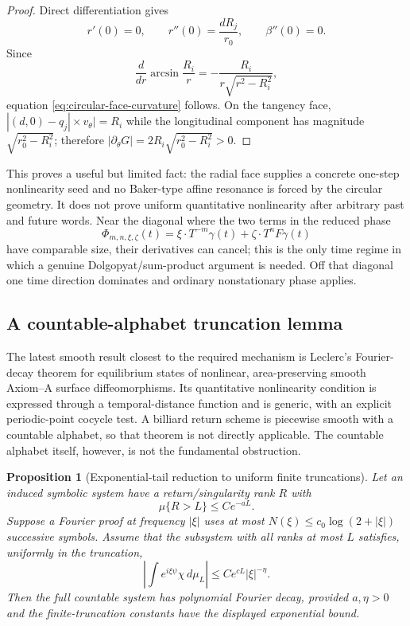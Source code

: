 \documentclass[11pt]{article}
\newtheorem{proposition}[theorem]{Proposition}
\begin{document}
\begin{proof}
Direct differentiation gives
\[
 r'(0)=0,\qquad r''(0)=\frac{dR_j}{r_0},\qquad
 \beta''(0)=0.
\]
Since
\[
 \frac d{dr}\arcsin\frac{R_i}{r}
 =-\frac{R_i}{r\sqrt{r^2-R_i^2}},
\]
equation \eqref{eq:circular-face-curvature} follows.  On the tangency face,
$|(d,0)-q_j|\times v_\theta|=R_i$ while the longitudinal component has
magnitude $\sqrt{r_0^2-R_i^2}$; therefore
$|\partial_\theta G|=2R_i\sqrt{r_0^2-R_i^2}>0$.
\end{proof}

This proves a useful but limited fact: the radial face supplies a concrete
one-step nonlinearity seed and no Baker-type affine resonance is forced by
the circular geometry.  It does not prove uniform quantitative nonlinearity
after arbitrary past and future words.  Near the diagonal where the two
terms in the reduced phase
\begin{equation}
\label{eq:phase}
 \Phi_{m,n,\xi,\zeta}(t)
 =\xi\cdot T^{-m}\gamma(t)+\zeta\cdot T^nF\gamma(t)
\end{equation}
have comparable size, their derivatives can cancel;
this is the only time regime in which a genuine Dolgopyat/sum-product
argument is needed.  Off that diagonal one time direction dominates and
ordinary nonstationary phase applies.

\subsection{A countable-alphabet truncation lemma}

The latest smooth result closest to the required mechanism is Leclerc's
Fourier-decay theorem for equilibrium states of nonlinear, area-preserving
smooth Axiom--A surface diffeomorphisms.  Its quantitative nonlinearity
condition is expressed through a temporal-distance function and is generic,
with an explicit periodic-point cocycle test.  A billiard return scheme is
piecewise smooth with a countable alphabet, so that theorem is not directly
applicable.  The countable alphabet itself, however, is not the fundamental
obstruction.

\begin{proposition}[Exponential-tail reduction to uniform finite truncations]
\label{prop:countable-truncation}
Let an induced symbolic system have a return/singularity rank $R$ with
\[
 \mu\{R>L\}\le C e^{-aL}.
\]
Suppose a Fourier proof at frequency $|\xi|$ uses at most
$N(\xi)\le c_0\log(2+|\xi|)$ successive symbols.  Assume that the subsystem
with all ranks at most $L$ satisfies, uniformly in the truncation,
\[
 \left|\int e^{i\xi\psi}\chi\,d\mu_L\right|
 \le C e^{cL}|\xi|^{-\eta}.
\]
Then the full countable system has polynomial Fourier decay, provided
$a,\eta>0$ and the finite-truncation constants have the displayed
exponential bound.
\end{proposition}
\end{document}
